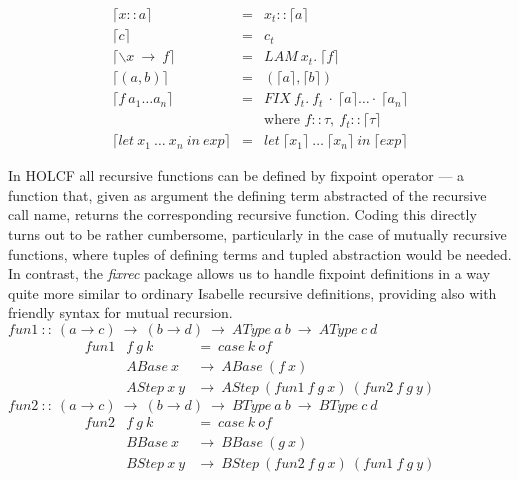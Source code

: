 \documentclass{llncs}
\begin{document}
$$\begin{array}{lcl} 
  \lceil x::a \rceil & = & x_{t}::\lceil a \rceil \\
  \lceil c \rceil & = & c_{t} \\
  \lceil \backslash x \ \to \ f \rceil & = & LAM \ x_{t}. \ \lceil f \rceil \\
  \lceil (a,b) \rceil & = & (\lceil a \rceil, \lceil b \rceil) \\
  \lceil f \ a_{1} \ldots a_{n} \rceil & = & FIX \ f_{t}. \ f_{t} \ \cdot \ 
  \lceil a \rceil \ldots \cdot \ \lceil a_{n} \rceil \\
  & & \mbox{where } f::\tau, \ f_{t}::\lceil \tau \rceil \\
  \lceil let \ x_{1} \ \dots \ x_{n} \ in \ exp \rceil & = 
         & let \ \lceil x_{1} \rceil \ \dots \ \lceil x_{n} \rceil \ in \ \lceil exp \rceil
\end{array}$$

\noindent In HOLCF all recursive functions can be defined by fixpoint
operator --- a function that, given as argument the defining term abstracted
of the recursive call name, returns the corresponding recursive function.
Coding this directly turns out to be rather cumbersome, particularly in the
case of mutually recursive functions, where tuples of defining terms and
tupled abstraction would be needed. In contrast, the \emph{fixrec} package
allows us to handle fixpoint definitions in a way quite more similar to
ordinary Isabelle recursive definitions, providing also with friendly syntax
for mutual recursion. \\

\noindent $ fun1 \ :: \ (a \to c) \ \to \ (b \to d) \
\to \ AType \ a \ b \ \to \ AType \ c \ d $ 
$$\begin{array}{lll}
  fun1 & f \ g \ k  & = \ case \ k \ of \\
  & ABase \ x & \to \ ABase \ (f \ x) \\
  & AStep \ x \ y & \to \ AStep \ (fun1 \ f \ g \ x) \ (fun2 \ f \ g \
  y)
\end{array} $$
$ fun2 \ :: \ (a \to c) \ \to \ (b \to d) \ \to \ BType \ a \ b \ \to \ BType \ c \ d $
$$\begin{array}{lll}
  fun2 & f \ g \ k & = \ case \ k \ of \\
  & BBase \ x & \to \ BBase \ (g \ x) \\
  & BStep \ x \ y & \to \ BStep \ (fun2 \ f \ g \ x) \ (fun1 \ f \ g \ y)
\end{array} $$ 
\end{document}
